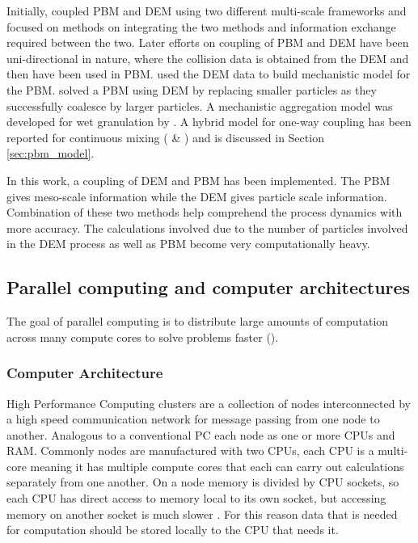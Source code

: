 \documentclass[preprint,11pt,authoryear]{elsarticle}
\begin{document}
Initially, \cite{ingram2005} coupled PBM and DEM using two different multi-scale frameworks and 
focused on methods on integrating the two methods and information exchange required between the 
two. Later efforts on coupling of PBM and DEM have been uni-directional in nature, where the collision 
data is obtained from the DEM and then have been used in PBM. \cite{gantt2006} used the DEM data 
to build mechanistic model for the PBM. \cite{Goldschmidt2003} solved a PBM using DEM by 
replacing smaller particles as they successfully coalesce by larger particles. A mechanistic aggregation 
model was developed for wet granulation by \cite{Reinhold2012}. A hybrid model for one-way coupling 
has been reported for continuous mixing (\cite{sen2013} \& \cite{sen2013b}) and is discussed in Section \ref{sec:pbm_model}.

In this work, a coupling of DEM and PBM has been implemented. The PBM gives meso-scale 
information while the DEM gives particle scale information. Combination of these two methods help 
comprehend the process dynamics with more accuracy. The calculations involved due to the number 
of particles involved in the DEM process as well as PBM become very computationally heavy. %

\subsection{Parallel computing and computer architectures}
 The goal of parallel computing is to distribute large amounts of computation across many 
compute cores to solve problems faster (\cite{wilkinson2005}).
\subsubsection{Computer Architecture}
High Performance Computing clusters are a collection of nodes interconnected by a high speed 
communication network for message passing from one node to another. Analogous to a conventional 
PC each node as one or more CPUs and RAM. Commonly nodes are manufactured with two CPUs, each CPU 
is a multi-core meaning it has multiple compute cores that each can carry out calculations 
separately from one another. %
On a node memory is divided by CPU sockets, so each CPU has direct access to memory local to its own 
socket, but accessing memory on another socket is much slower \cite{Jin2011}. For this reason data 
that is needed for computation should be stored locally to the CPU that needs it.  
\end{document}
